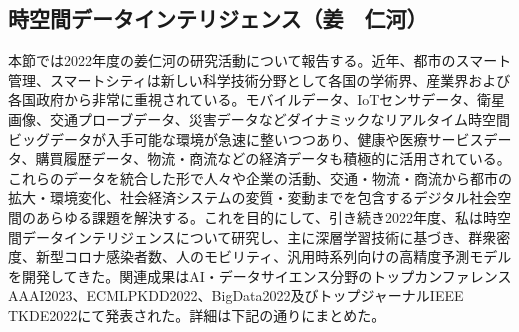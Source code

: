 \subsection{時空間データインテリジェンス（姜　仁河）}
本節では2022年度の姜仁河の研究活動について報告する。近年、都市のスマート管理、スマートシティは新しい科学技術分野として各国の学術界、産業界および各国政府から非常に重視されている。モバイルデータ、IoTセンサデータ、衛星画像、交通プローブデータ、災害データなどダイナミックなリアルタイム時空間ビッグデータが入手可能な環境が急速に整いつつあり、健康や医療サービスデータ、購買履歴データ、物流・商流などの経済データも積極的に活用されている。これらのデータを統合した形で人々や企業の活動、交通・物流・商流から都市の拡大・環境変化、社会経済システムの変質・変動までを包含するデジタル社会空間のあらゆる課題を解決する。これを目的にして、引き続き2022年度、私は時空間データインテリジェンスについて研究し、主に深層学習技術に基づき、群衆密度、新型コロナ感染者数、人のモビリティ、汎用時系列向けの高精度予測モデルを開発してきた。関連成果はAI・データサイエンス分野のトップカンファレンスAAAI2023、ECMLPKDD2022、BigData2022及びトップジャーナルIEEE TKDE2022にて発表された。詳細は下記の通りにまとめた。
\cite{JIANG1-1,JIANG1-2,JIANG1-3,JIANG1-4,JIANG1-5,JIANG1-6,JIANG1-7}
\cite{JIANG2-1,JIANG2-2,JIANG2-3,JIANG2-4,JIANG2-5,JIANG2-6,JIANG2-7,JIANG2-8}

